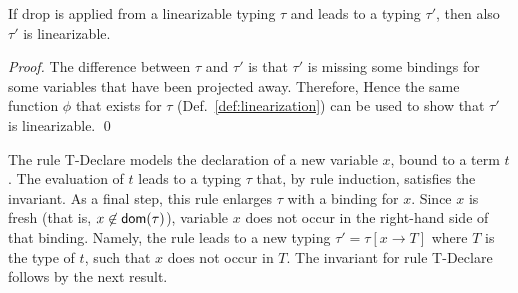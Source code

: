 \begin{lemma}\label{lem:drop_invariant}
  If \textsf{drop} is applied from a linearizable typing $\tau$
  and leads to a typing $\tau'$, then also $\tau'$ is linearizable.
\end{lemma}
\begin{proof}
  The difference between $\tau$ and $\tau'$ is that $\tau'$ is missing some
  bindings for some variables that have been projected away. Therefore,
  Hence the same function $\phi$ that exists for $\tau$ (Def.~\ref{def:linearization})
  can be used to show that $\tau'$ is linearizable.
  \qed
\end{proof}

The rule \textsf{T-Declare} models the declaration of a new variable $x$,
bound to a term $t$. The evaluation of $t$ leads to a typing $\tau$ that, by rule induction,
satisfies the invariant. As a final step, this rule
enlarges $\tau$ with a binding for $x$. Since $x$ is
fresh (that is, $x\not\in\mathsf{dom}(\tau)$),
variable $x$ does not occur in the right-hand side of that binding. Namely, the rule
leads to a new typing $\tau'=\tau[x\to T]$ where $T$ is the type of $t$, such that
$x$ does not occur in $T$. The invariant for rule \textsf{T-Declare} follows by the next result.

